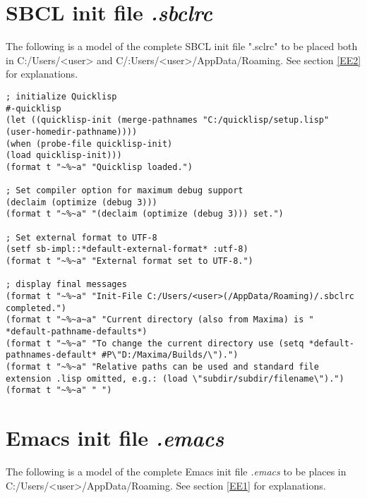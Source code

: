 \documentclass[../Maxima_Workbook.tex]{subfiles}
\begin{document}
\chapter{SBCL init file \emph{.sbclrc}}\label{AA2}

The following is a model of the complete SBCL init file ".sclrc" to be placed both in C:/Users/<user> and C/:Users/<user>/AppData/Roaming. See section \ref{EE2} for explanations.

\begin{lstlisting}[style=lisp]
; initialize Quicklisp
#-quicklisp
(let ((quicklisp-init (merge-pathnames "C:/quicklisp/setup.lisp" (user-homedir-pathname))))
(when (probe-file quicklisp-init)
(load quicklisp-init)))
(format t "~%~a" "Quicklisp loaded.")

; Set compiler option for maximum debug support
(declaim (optimize (debug 3)))
(format t "~%~a" "(declaim (optimize (debug 3))) set.")

; Set external format to UTF-8
(setf sb-impl::*default-external-format* :utf-8)
(format t "~%~a" "External format set to UTF-8.")

; display final messages
(format t "~%~a" "Init-File C:/Users/<user>(/AppData/Roaming)/.sbclrc completed.")
(format t "~%~a~a" "Current directory (also from Maxima) is " *default-pathname-defaults*)
(format t "~%~a" "To change the current directory use (setq *default-pathnames-default* #P\"D:/Maxima/Builds/\").")
(format t "~%~a" "Relative paths can be used and standard file extension .lisp omitted, e.g.: (load \"subdir/subdir/filename\").")
(format t "~%~a" " ")
\end{lstlisting}

\chapter{Emacs init file \emph{.emacs}}\label{AA1}

The following is a model of the complete Emacs init file \emph{.emacs} to be places in C:/Users/<user>/AppData/Roaming. See section \ref{EE1} for explanations.
\end{document}
